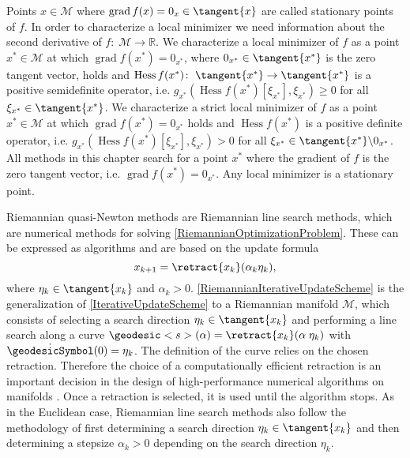 Points $x \in \mathcal{M}$ where $\operatorname{grad}f(x) = 0_x \in \tangent{x}$ are called stationary points of $f$. In order to characterize a local minimizer we need information about the second derivative of $f \colon \; \mathcal{M} \to \mathbb{R}$. We characterize a local minimizer of $f$ as a point $x^* \in \mathcal{M}$ at which $\operatorname{grad} f(x^*) = 0_{x^*}$, where $0_{x^*} \in \tangent{x^*}$ is the zero tangent vector, holds and $\operatorname{Hess} f(x^*) \colon \; \tangent{x^*} \to \tangent{x^*}$ is a positive semidefinite operator, i.e. $g_{x^*} (\operatorname{Hess} f(x^*)[\xi_{x^*}], \xi_{x^*}) \geq 0$ for all $\xi_{x^*} \in \tangent{x^*}$. We characterize a strict local minimizer of $f$ as a point $x^* \in \mathcal{M}$ at which $\operatorname{grad} f(x^*) = 0_{x^*}$ holds and $\operatorname{Hess} f(x^*)$ is a positive definite operator, i.e. $g_{x^*} (\operatorname{Hess} f(x^*)[\xi_{x^*}], \xi_{x^*}) > 0$ for all $\xi_{x^*} \in \tangent{x^*} \backslash 0_{x^*}$. All methods in this chapter search for a point $x^*$ where the gradient of $f$ is the zero tangent vector, i.e. $\operatorname{grad} f(x^*) = 0_{x^*}$. Any local minimizer is a stationary point. \newpage

Riemannian quasi-Newton methods are Riemannian line search methods, which are numerical methods for solving \cref{RiemannianOptimizationProblem}. These can be expressed as algorithms and are based on the update formula
\begin{equation}\label{RiemannianIterativeUpdateScheme}
    x_{k+1} = \retract{x_k}(\alpha_k \eta_k),
\end{equation}
where $\eta_k \in \tangent{x_k}$ and $\alpha_k > 0$. \cref{RiemannianIterativeUpdateScheme} is the generalization of \cref{IterativeUpdateScheme} to a Riemannian manifold $\mathcal{M}$, which consists of selecting a search direction $\eta_k \in \tangent{x_k}$ and performing a line search along a curve $\geodesic<s>(\alpha) = \retract{x_k}(\alpha \; \eta_k)$ with $\dot{\geodesicSymbol}(0) = \eta_k$. The definition of the curve relies on the chosen retraction. Therefore the choice of a computationally efficient retraction is an important decision in the design of high-performance numerical algorithms on manifolds \cite[p.~54]{AbsilMahonySepulchre:2008}. Once a retraction is selected, it is used until the algorithm stops. As in the Euclidean case, Riemannian line search methods also follow the methodology of first determining a search direction $\eta_k \in \tangent{x_k}$ and then determining a stepsize $\alpha_k > 0$ depending on the search direction $\eta_k$. \\

